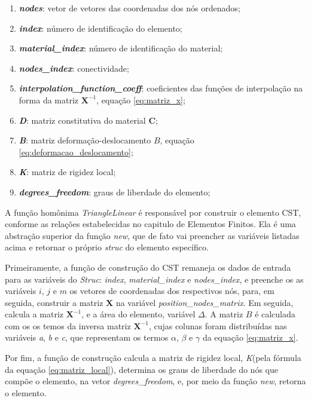 \begin{enumerate}
    \item \textbf{\emph{nodes}}: vetor de vetores das coordenadas dos nós ordenados;
   \item \textbf{\emph{index}}: número de identificação do elemento;
   \item \textbf{\emph{material\_index}}: número de identificação do material;
   \item \textbf{\emph{nodes\_index}}: conectividade;
   \item \textbf{\emph{interpolation\_function\_coeff}}: coeficientes das funções de interpolação na forma da matriz $\bm{X}^{-1}$, equação \ref{eq:matriz_x};
   \item \textbf{\emph{D}}: matriz constitutiva do material $\bm{C}$;
   \item \textbf{\emph{B}}: matriz deformação-deslocamento $B$, equação \ref{eq:deformacao_deslocamento};
   \item \textbf{\emph{K}}: matriz de rigidez local;
   \item \textbf{\emph{degrees\_freedom}}: graus de liberdade do elemento;
\end{enumerate}

A função homônima \emph{TriangleLinear} é responsável por construir o elemento CST, conforme as relações estabelecidas no capitulo de Elementos Finitos. Ela é uma abstração superior da função \emph{new}, que de fato vai preencher as variáveis listadas acima e retornar o próprio \emph{struc} do elemento específico.


Primeiramente, a função de construção do CST remaneja os dados de entrada para as variáveis do \emph{Struc}: \emph{index}, \emph{material\_index} e \emph{nodes\_index}, e preenche os as variáveis $i$, $j$ e $m$ os vetores de coordenadas dos respectivos nós, para, em seguida, construir a matriz $\bm{X}$ na variável \emph{position\_nodes\_matrix}. Em seguida, calcula a matriz $\bm{X}^{-1}$, e a área do elemento, variável \emph{$\Delta$}. A matriz $B$ é calculada com os os temos da inversa matriz $\bm{X}^{-1}$, cujas colunas foram distribuídas nas variáveis \emph{a}, \emph{b} e \emph{c}, que representam os termos $\alpha$, $\beta$ e $\gamma$ da equação \ref{eq:matriz_x}. 

Por fim, a função de construção calcula a matriz de rigidez local, \emph{K}(pela fórmula da equação \ref{eq:matriz_local}), determina os graus de liberdade do nós que compõe o elemento, na vetor \emph{degrees\_freedom}, e, por meio da função \emph{new}, retorna o elemento.

